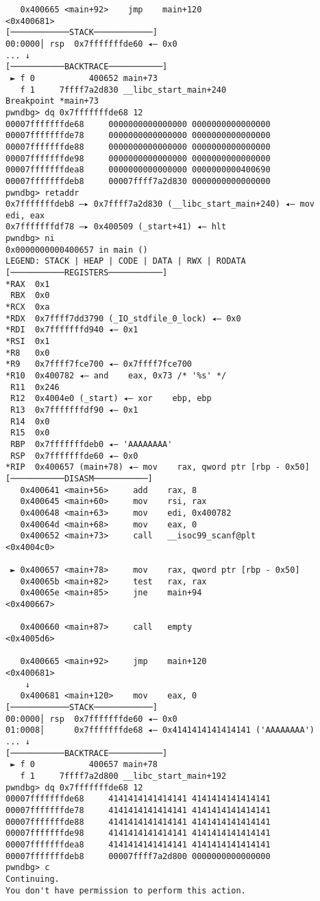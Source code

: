 \documentclass{article}
\begin{document}
\begin{lstlisting}
   0x400665 <main+92>    jmp    main+120                      <0x400681>
[────────────STACK────────────]
00:0000│ rsp  0x7fffffffde60 ◂— 0x0
... ↓
[───────────BACKTRACE───────────]
 ► f 0           400652 main+73
   f 1     7ffff7a2d830 __libc_start_main+240
Breakpoint *main+73
pwndbg> dq 0x7fffffffde68 12
00007fffffffde68     0000000000000000 0000000000000000
00007fffffffde78     0000000000000000 0000000000000000
00007fffffffde88     0000000000000000 0000000000000000
00007fffffffde98     0000000000000000 0000000000000000
00007fffffffdea8     0000000000000000 0000000000400690
00007fffffffdeb8     00007ffff7a2d830 0000000000000000
pwndbg> retaddr
0x7fffffffdeb8 —▸ 0x7ffff7a2d830 (__libc_start_main+240) ◂— mov    edi, eax
0x7fffffffdf78 —▸ 0x400509 (_start+41) ◂— hlt    
pwndbg> ni
0x0000000000400657 in main ()
LEGEND: STACK | HEAP | CODE | DATA | RWX | RODATA
[───────────REGISTERS───────────]
*RAX  0x1
 RBX  0x0
*RCX  0xa
*RDX  0x7ffff7dd3790 (_IO_stdfile_0_lock) ◂— 0x0
*RDI  0x7fffffffd940 ◂— 0x1
*RSI  0x1
*R8   0x0
*R9   0x7ffff7fce700 ◂— 0x7ffff7fce700
*R10  0x400782 ◂— and    eax, 0x73 /* '%s' */
 R11  0x246
 R12  0x4004e0 (_start) ◂— xor    ebp, ebp
 R13  0x7fffffffdf90 ◂— 0x1
 R14  0x0
 R15  0x0
 RBP  0x7fffffffdeb0 ◂— 'AAAAAAAA'
 RSP  0x7fffffffde60 ◂— 0x0
*RIP  0x400657 (main+78) ◂— mov    rax, qword ptr [rbp - 0x50]
[───────────DISASM───────────]
   0x400641 <main+56>     add    rax, 8
   0x400645 <main+60>     mov    rsi, rax
   0x400648 <main+63>     mov    edi, 0x400782
   0x40064d <main+68>     mov    eax, 0
   0x400652 <main+73>     call   __isoc99_scanf@plt            <0x4004c0>
 
 ► 0x400657 <main+78>     mov    rax, qword ptr [rbp - 0x50]
   0x40065b <main+82>     test   rax, rax
   0x40065e <main+85>     jne    main+94                       <0x400667>
 
   0x400660 <main+87>     call   empty                         <0x4005d6>
 
   0x400665 <main+92>     jmp    main+120                      <0x400681>
    ↓
   0x400681 <main+120>    mov    eax, 0
[────────────STACK────────────]
00:0000│ rsp  0x7fffffffde60 ◂— 0x0
01:0008│      0x7fffffffde68 ◂— 0x4141414141414141 ('AAAAAAAA')
... ↓
[───────────BACKTRACE───────────]
 ► f 0           400657 main+78
   f 1     7ffff7a2d800 __libc_start_main+192
pwndbg> dq 0x7fffffffde68 12
00007fffffffde68     4141414141414141 4141414141414141
00007fffffffde78     4141414141414141 4141414141414141
00007fffffffde88     4141414141414141 4141414141414141
00007fffffffde98     4141414141414141 4141414141414141
00007fffffffdea8     4141414141414141 4141414141414141
00007fffffffdeb8     00007ffff7a2d800 0000000000000000
pwndbg> c
Continuing.
You don't have permission to perform this action.


\end{lstlisting}
\end{document}
